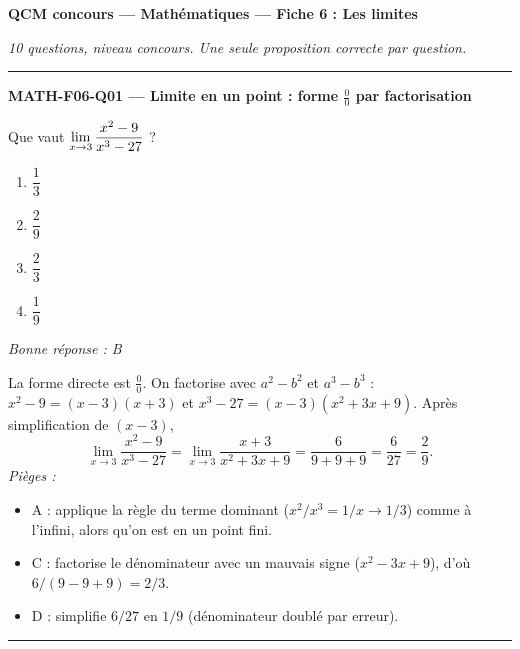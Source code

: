 \documentclass[11pt,a4paper]{article}
\begin{document}
\begin{center}
{\large\textbf{QCM concours --- Mathématiques --- Fiche 6 : Les limites}}\par
\textit{10 questions, niveau concours. Une seule proposition correcte par question.}
\end{center}
\vspace{6pt}\hrule\vspace{10pt}

\noindent\textbf{MATH-F06-Q01 --- Limite en un point : forme $\frac00$ par factorisation}\par
Que vaut $\displaystyle\lim_{x\to 3}\frac{x^{2}-9}{x^{3}-27}$ ?
\begin{enumerate}[label=\Alph*)]
\item $\dfrac{1}{3}$
\item $\dfrac{2}{9}$
\item $\dfrac{2}{3}$
\item $\dfrac{1}{9}$
\end{enumerate}
\textit{Bonne réponse : B}\par
La forme directe est $\frac00$. On factorise avec $a^{2}-b^{2}$ et $a^{3}-b^{3}$ :
$x^{2}-9=(x-3)(x+3)$ et $x^{3}-27=(x-3)(x^{2}+3x+9)$. Après simplification de $(x-3)$,
\[ \lim_{x\to 3}\frac{x^{2}-9}{x^{3}-27}=\lim_{x\to 3}\frac{x+3}{x^{2}+3x+9}=\frac{6}{9+9+9}=\frac{6}{27}=\frac{2}{9}. \]
\textit{Pièges :}
\begin{itemize}
\item A : applique la règle du terme dominant ($x^{2}/x^{3}=1/x\to 1/3$) comme à l'infini, alors qu'on est en un point fini.
\item C : factorise le dénominateur avec un mauvais signe ($x^{2}-3x+9$), d'où $6/(9-9+9)=2/3$.
\item D : simplifie $6/27$ en $1/9$ (dénominateur doublé par erreur).
\end{itemize}
\vspace{8pt}\hrule\vspace{8pt}
\end{document}
